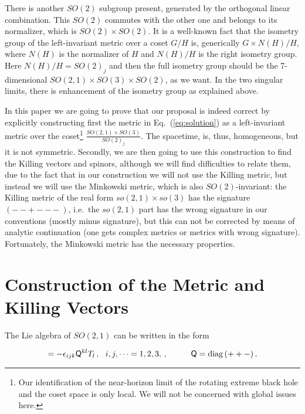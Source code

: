 \documentclass[12pt,a4paper]{article}
\begin{document}
There is another $SO(2)$ subgroup present, generated by the orthogonal
linear combination. This $SO(2)$ commutes with the other one and
belongs to its normalizer, which is $SO(2)\times SO(2)$. It is a
well-known fact \cite{Coquereaux:ne} that the isometry group of the
left-invariant metric over a coset $G/H$ is, generically $G\times
N(H)/H$, where $N(H)$ is the normalizer of $H$ and $N(H)/H$ is the
right isometry group. Here $N(H)/H=SO(2)_{j}$ and then the full isometry
group should be the 7-dimensional $SO(2,1)\times SO(3)\times SO(2)$,
as we want. In the two singular limits, there is enhancement of the
isometry group as explained above.

In this paper we are going to prove that our proposal is indeed correct by
explicitly constructing first the metric in Eq.~(\ref{eq:solution}) as a
left-invariant metric over the coset\footnote{Our identification of the
  near-horizon limit of the rotating extreme black hole and the coset space is
  only local. We will not be concerned with global issues here.}
$\frac{SO(2,1)\times SO(3)}{SO(2)_{j}}$.  The spacetime, is, thus,
homogeneous, but it is not symmetric. Secondly, we are then going to use this
construction to find the Killing vectors and spinors, although we will find
difficulties to relate them, due to the fact that in our construction we will
not use the Killing metric, but instead we will use the Minkowski metric,
which is also $SO(2)$-invariant: the Killing metric of the real form
$so(2,1)\times so(3)$ has the signature $(--+---)$, i.e.~the $so(2,1)$ part
has the wrong signature in our conventions (mostly minus signature), but this
can not be corrected by means of analytic continuation (one gets complex
metrics or metrics with wrong signature). Fortunately, the Minkowski metric
has the necessary properties.


\section*{Construction of the Metric and Killing Vectors}

The Lie algebra of $SO(2,1)$ can be written in the form

\begin{equation}
[T_{i},T_{j}]=-\epsilon_{ijk}\mathsf{Q}^{kl}T_{l}\, ,
\,\,\,\,
i,j,\cdots=1,2,3,\, ,  
\hspace{1cm}
\mathsf{Q}={\rm diag}\, (++-)\, , 
\end{equation}
\end{document}
